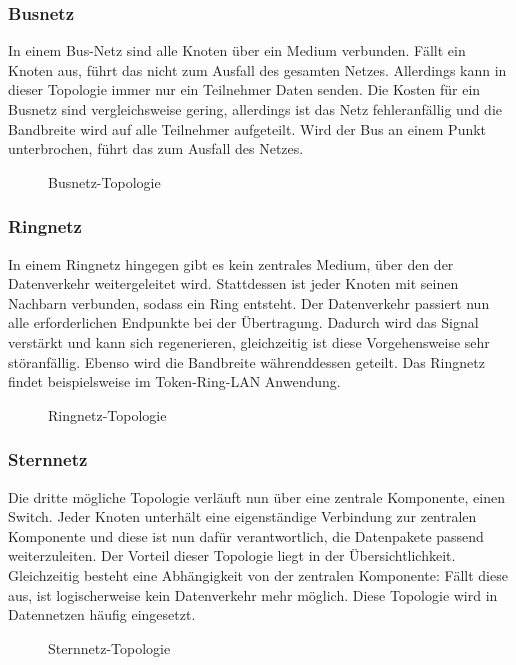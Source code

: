 \documentclass[11pt,a4paper]{scrartcl}
\begin{document}
\subsubsection{Busnetz}
In einem Bus-Netz sind alle Knoten über ein Medium verbunden. Fällt ein Knoten aus, führt das nicht zum Ausfall des gesamten Netzes. Allerdings kann in dieser Topologie immer nur ein Teilnehmer Daten senden. Die Kosten für ein Busnetz sind vergleichsweise gering, allerdings ist das Netz fehleranfällig und die Bandbreite wird auf alle Teilnehmer aufgeteilt. Wird der Bus an einem Punkt unterbrochen, führt das zum Ausfall des Netzes.
\begin{figure}[h]
\centering
{}
\caption{Busnetz-Topologie}
\end{figure}
\subsubsection{Ringnetz}
In einem Ringnetz hingegen gibt es kein zentrales Medium, über den der Datenverkehr weitergeleitet wird. Stattdessen ist jeder Knoten mit seinen Nachbarn verbunden, sodass ein Ring entsteht. Der Datenverkehr passiert nun alle erforderlichen Endpunkte bei der Übertragung. Dadurch wird das Signal verstärkt und kann sich regenerieren, gleichzeitig ist diese Vorgehensweise sehr störanfällig. Ebenso wird die Bandbreite währenddessen geteilt. Das Ringnetz findet beispielsweise im Token-Ring-LAN Anwendung.
\begin{figure}[h]
\centering
{}
\caption{Ringnetz-Topologie}
\end{figure}
\subsubsection{Sternnetz}
Die dritte mögliche Topologie verläuft nun über eine zentrale Komponente, einen Switch. Jeder Knoten unterhält eine eigenständige Verbindung zur zentralen Komponente und diese ist nun dafür verantwortlich, die Datenpakete passend weiterzuleiten. Der Vorteil dieser Topologie liegt in der Übersichtlichkeit. Gleichzeitig besteht eine Abhängigkeit von der zentralen Komponente: Fällt diese aus, ist logischerweise kein Datenverkehr mehr möglich. Diese Topologie wird in Datennetzen häufig eingesetzt.
\begin{figure}[h]
\centering
{}
\caption{Sternnetz-Topologie}
\end{figure}
\end{document}
